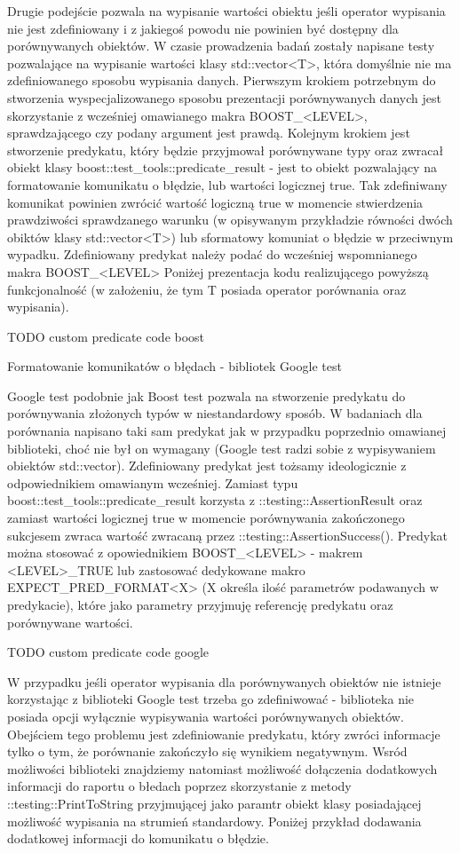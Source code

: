 Drugie podejście pozwala na wypisanie wartości obiektu jeśli operator wypisania nie jest zdefiniowany i z jakiegoś powodu nie powinien być dostępny dla porównywanych obiektów.
W czasie prowadzenia badań zostały napisane testy pozwalające na wypisanie wartości klasy std::vector<T>, która domyślnie nie ma zdefiniowanego sposobu wypisania danych.
Pierwszym krokiem potrzebnym do stworzenia wyspecjalizowanego sposobu prezentacji porównywanych danych jest skorzystanie z wcześniej omawianego makra BOOST_<LEVEL>, sprawdzającego czy podany argument jest prawdą. Kolejnym krokiem jest stworzenie predykatu, który będzie przyjmował porównywane typy oraz zwracał obiekt klasy boost::test_tools::predicate_result - jest to obiekt pozwalający na formatowanie komunikatu o błędzie, lub wartości logicznej true.
Tak zdefiniwany komunikat powinien zwrócić wartość logiczną true w momencie stwierdzenia prawdziwości sprawdzanego warunku (w opisywanym przykładzie równości dwóch obiktów klasy std::vector<T>) lub sformatowy komuniat o błędzie w przeciwnym wypadku.
Zdefiniowany predykat należy podać do wcześniej wspomnianego makra BOOST_<LEVEL>
Poniżej prezentacja kodu realizującego powyższą funkcjonalność (w założeniu, że tym T posiada operator porównania oraz wypisania).

TODO custom predicate code boost

Formatowanie komunikatów o błędach - bibliotek Google test

Google test podobnie jak Boost test pozwala na stworzenie predykatu do porównywania złożonych typów w niestandardowy sposób. W badaniach dla porównania napisano taki sam predykat jak w przypadku poprzednio omawianej biblioteki, choć nie był on wymagany (Google test radzi sobie z wypisywaniem obiektów std::vector).
Zdefiniowany predykat jest tożsamy ideologicznie z odpowiednikiem omawianym wcześniej. Zamiast typu boost::test_tools::predicate_result korzysta z ::testing::AssertionResult oraz zamiast wartości logicznej true w momencie porównywania zakończonego sukcjesem zwraca wartość zwracaną przez ::testing::AssertionSuccess().
Predykat można stosować z opowiednikiem BOOST_<LEVEL> - makrem <LEVEL>_TRUE lub zastosować dedykowane makro EXPECT_PRED_FORMAT<X> (X określa ilość parametrów podawanych w predykacie), które jako parametry przyjmuję referencję predykatu oraz porównywane wartości.

TODO custom predicate code google

W przypadku jeśli operator wypisania dla porównywanych obiektów nie istnieje korzystając z biblioteki Google test trzeba go zdefiniwować - biblioteka nie posiada opcji wyłącznie wypisywania wartości porównywanych obiektów. Obejściem tego problemu jest zdefiniowanie predykatu, który zwróci informacje tylko o tym, że porównanie zakończyło się wynikiem negatywnym.
Wsród możliwości biblioteki znajdziemy natomiast możliwość dołączenia dodatkowych informacji do raportu o błedach poprzez skorzystanie z metody ::testing::PrintToString przyjmującej jako paramtr obiekt klasy posiadającej możliwość wypisania na strumień standardowy.
Poniżej przykład dodawania dodatkowej informacji do komunikatu o błędzie.

